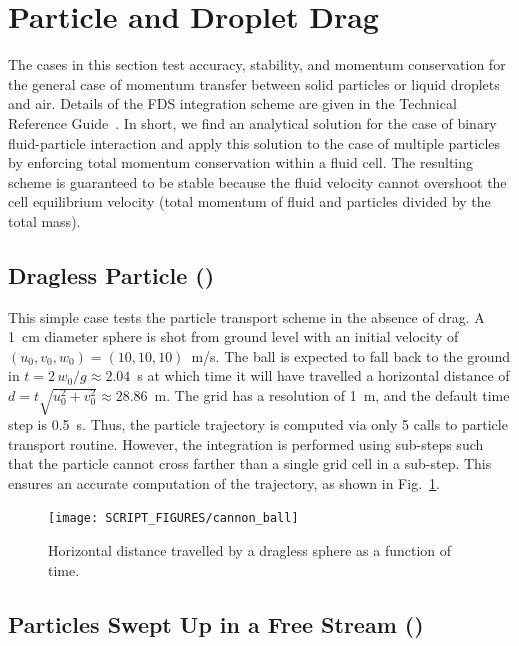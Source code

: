\documentclass[11pt]{book}
\begin{document}
\section{Particle and Droplet Drag}

The cases in this section test accuracy, stability, and momentum conservation for the general case of momentum transfer between solid particles or liquid droplets and air. Details of the FDS integration scheme are given in the Technical Reference Guide~\cite{FDS_Tech_Guide}.  In short, we find an analytical solution for the case of binary fluid-particle interaction and apply this solution to the case of multiple particles by enforcing total momentum conservation within a fluid cell.  The resulting scheme is guaranteed to be stable because the fluid velocity cannot overshoot the cell equilibrium velocity (total momentum of fluid and particles divided by the total mass).

\subsection{Dragless Particle (\texorpdfstring{}{cannon\_ball})}
\label{cannon_ball}

This simple case tests the particle transport scheme in the absence of drag. A 1~cm diameter sphere is shot from ground level with an initial velocity of $(u_0,v_0,w_0)=(10,10,10)$~m/s. The ball is expected to fall back to the ground in $t=2\, w_0/g\approx 2.04$~s at which time it will have travelled a horizontal distance of $d=t \sqrt{u_0^2+v_0^2}\approx 28.86$~m. The grid has a resolution of 1~m, and the default time step is 0.5~s. Thus, the particle trajectory is computed via only 5 calls to particle transport routine. However, the integration is performed using sub-steps such that the particle cannot cross farther than a single grid cell in a sub-step. This ensures an accurate computation of the trajectory, as shown in Fig.~\ref{cannon_ball_fig}.

\begin{figure}[!ht]
\centering
\texttt{[image: SCRIPT\_FIGURES/cannon\_ball]}
\caption[The {\ct cannon\_ball} case]{Horizontal distance travelled by a dragless sphere as a function of time.}
\label{cannon_ball_fig}
\end{figure}


\subsection{Particles Swept Up in a Free Stream (\texorpdfstring{}{fluid\_part\_mom})}
\end{document}
